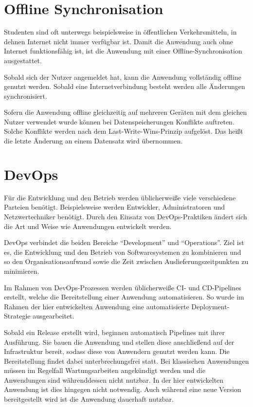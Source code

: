 \section{Offline Synchronisation}
Studenten sind oft unterwegs beispielsweise in öffentlichen Verkehrsmitteln, in dehnen Internet nicht immer verfügbar ist.
Damit die Anwendung auch ohne Internet funktionsfähig ist, ist die Anwendung mit einer Offline-Synchronisation ausgestattet.

Sobald sich der Nutzer angemeldet hat, kann die Anwendung vollständig offline genutzt werden.
Sobald eine Internetverbindung besteht werden alle Änderungen synchronisiert.

Sofern die Anwendung offline gleichzeitig auf mehreren Geräten mit dem gleichen Nutzer verwendet wurde können bei Datenspeicherungen Konflikte auftreten.
Solche Konflikte werden nach dem Last-Write-Wins-Prinzip aufgelöst.
Das heißt die letzte Änderung an einem Datensatz wird übernommen.

\section{DevOps}
Für die Entwicklung und den Betrieb werden üblicherweiße viele verschiedene Parteien benötigt.
Beispielsweise werden Entwickler, Administratoren und Netzwertechniker benötigt.
Durch den Einsatz von DevOps-Praktiken ändert sich die Art und Weise wie Anwendungen entwickelt werden.

DevOps verbindet die beiden Bereiche \enquote{Development} und \enquote{Operations}.
Ziel ist es, die Entwicklung und den Betrieb von Softwaresystemen zu kombinieren und so den Organisationsaufwand sowie die Zeit zwischen Auslieferungszeitpunkten zu minimieren.\autocite[][S. 156]{Artac2018}

Im Rahmen von DevOps-Prozessen werden üblicherweiße \ac{CI}- und \ac{CD}-Pipelines erstellt, welche die Bereitstellung einer Anwendung automatisieren.
So wurde im Rahmen der hier entwickelten Anwendung eine automatisierte Deployment-Strategie ausgearbeitet.

Sobald ein Release erstellt wird, beginnen automatisch Pipelines mit ihrer Ausführung. Sie bauen die Anwendung und stellen diese anschließend auf der Infrastruktur bereit, sodass diese von Anwendern genutzt werden kann.
Die Bereitstellung findet dabei unterbrechungsfrei statt.
Bei klassischen Anwendungen müssen im Regelfall Wartungsarbeiten angekündigt werden und die Anwendungen sind währenddessen nicht nutzbar.
In der hier entwickelten Anwendung ist dies hingegen nicht notwendig.
Auch während eine neue Version bereitgestellt wird ist die Anwendung dauerhaft nutzbar.

